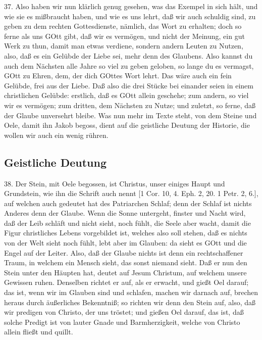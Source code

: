 37. Also haben wir nun klärlich genug gesehen, was das Exempel in sich hält, und wie sie es mißbraucht haben, und wie es uns lehrt, daß wir auch schuldig sind, zu geben zu dem rechten Gottesdienste, nämlich, das Wort zu erhalten; doch so ferne als uns GOtt gibt, daß wir es vermögen, und nicht der Meinung, ein gut Werk zu thun, damit man etwas verdiene, sondern andern Leuten zu Nutzen, also, daß es ein Gelübde der Liebe sei, mehr denn des Glaubens. Also kannst du auch dem Nächsten alle Jahre so viel zu geben geloben, so lange du es vermagst, GOtt zu Ehren, dem, der dich GOttes Wort lehrt. Das wäre auch ein fein Gelübde, frei aus der Liebe. Daß also die drei Stücke bei einander seien in einem christlichen Gelübde: erstlich, daß es GOtt allein geschehe; zum andern, so viel wir es vermögen; zum dritten, dem Nächsten zu Nutze; und zuletzt, so ferne, daß der Glaube unversehrt bleibe. Was nun mehr im Texte steht, von dem Steine und Oele, damit ihn Jakob begoss, dient auf die geistliche Deutung der Historie, die wollen wir auch ein wenig rühren.

\subsection{Geistliche Deutung}
38. Der Stein, mit Oele begossen, ist Christus, unser einiges Haupt und Grundstein, wie ihn die Schrift auch nennt [1 Cor. 10, 4. Eph. 2, 20. 1 Petr. 2, 6.], auf welchen auch gedeutet hat des Patriarchen Schlaf; denn der Schlaf ist nichts Anderes denn der Glaube. Wenn die Sonne untergeht, finster und Nacht wird, daß der Leib schläft und nicht sieht, noch fühlt, die Seele aber wacht, damit die Figur christliches Lebens vorgebildet ist, welches also soll stehen, daß es nichts von der Welt sieht noch fühlt, lebt aber im Glauben: da sieht es GOtt und die Engel auf der Leiter. Also, daß der Glaube nichts ist denn ein rechtschaffener Traum, in welchem ein Mensch sieht, das sonst niemand
sieht. Daß er nun den Stein unter den Häupten hat, deutet auf Jesum Christum, auf welchem unsere Gewissen ruhen. Denselben richtet er auf, als er erwacht, und gießt Oel darauf; das ist, wenn wir im Glauben sind und schlafen, machen wir darnach auf, brechen heraus durch äußerliches Bekenntniß; so richten wir denn den Stein auf, also, daß wir predigen von Christo, der uns tröstet; und gießen Oel darauf, das ist, daß solche Predigt ist von lauter Gnade und Barmherzigkeit, welche von Christo allein fließt und quillt.

